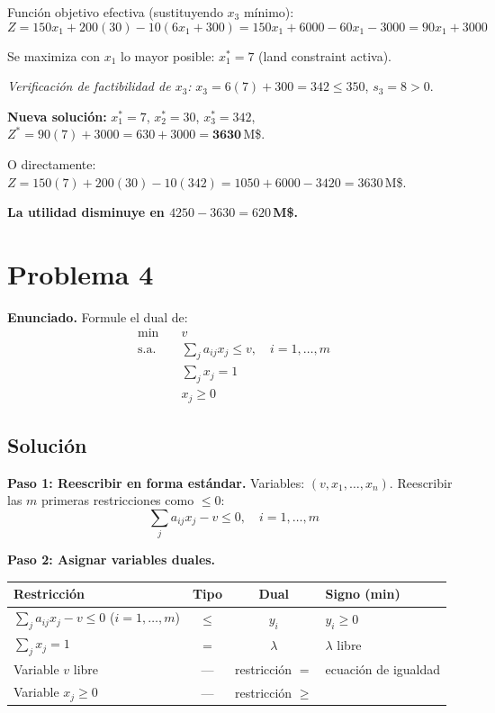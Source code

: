 \documentclass{article}
\begin{document}
\begin{enumerate}[a)]
Función objetivo efectiva (sustituyendo $x_3$ mínimo):
$$Z=150x_1+200(30)-10(6x_1+300)=150x_1+6000-60x_1-3000=90x_1+3000$$

Se maximiza con $x_1$ lo mayor posible: $x_1^*=7$ (land constraint activa).

\textit{Verificación de factibilidad de $x_3$:} $x_3=6(7)+300=342\leq350$\;\checkmark, $s_3=8>0$.

\textbf{Nueva solución:} $x_1^*=7$, $x_2^*=30$, $x_3^*=342$, $Z^*=90(7)+3000=630+3000=\mathbf{3630}$\,M\$.

O directamente: $Z=150(7)+200(30)-10(342)=1050+6000-3420=3630$\,M\$.

\textbf{La utilidad disminuye en $4250-3630=620$\,M\$.}

\end{enumerate}

\newpage
\section*{Problema 4}

\textbf{Enunciado.} Formule el dual de:
$$\begin{aligned}
\min\quad &v\\
\text{s.a.}\quad &\sum_j a_{ij}x_j\leq v,\quad i=1,\ldots,m\\
&\sum_j x_j=1\\
&x_j\geq0
\end{aligned}$$

\subsection*{Solución}

\textbf{Paso 1: Reescribir en forma estándar.} Variables: $(v, x_1,\ldots,x_n)$. Reescribir las $m$ primeras restricciones como $\leq0$:
$$\sum_j a_{ij}x_j - v \leq 0,\quad i=1,\ldots,m$$

\textbf{Paso 2: Asignar variables duales.}

\begin{center}
\renewcommand{\arraystretch}{1.3}
\begin{tabular}{lccl}
\hline
Restricción & Tipo & Dual & Signo (min)\\
\hline
$\sum_j a_{ij}x_j - v\leq0$ ($i=1,\ldots,m$) & $\leq$ & $y_i$ & $y_i\geq0$\\
$\sum_j x_j = 1$ & $=$ & $\lambda$ & $\lambda$ libre\\
\hline
Variable $v$ libre & --- & restricción $=$ & ecuación de igualdad\\
Variable $x_j\geq0$ & --- & restricción $\geq$ & \\
\hline
\end{tabular}
\end{center}
\end{document}
